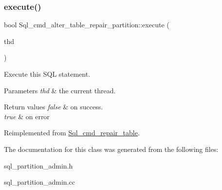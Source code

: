 \subsubsection{\texorpdfstring{execute()}{execute()}}
{\footnotesize\ttfamily bool Sql\+\_\+cmd\+\_\+alter\+\_\+table\+\_\+repair\+\_\+partition\+::execute (\begin{DoxyParamCaption}\item[{T\+HD $\ast$}]{thd }\end{DoxyParamCaption})\hspace{0.3cm}{\ttfamily [virtual]}}

Execute this S\+QL statement. 
\begin{DoxyParams}{Parameters}
{\em thd} & the current thread. \\
\hline
\end{DoxyParams}

\begin{DoxyRetVals}{Return values}
{\em false} & on success. \\
\hline
{\em true} & on error \\
\hline
\end{DoxyRetVals}


Reimplemented from \mbox{\hyperlink{classSql__cmd__repair__table_abb68d28756b9713e0d46774b3cafe39c}{Sql\+\_\+cmd\+\_\+repair\+\_\+table}}.



The documentation for this class was generated from the following files\+:\begin{DoxyCompactItemize}
\item 
sql\+\_\+partition\+\_\+admin.\+h\item 
sql\+\_\+partition\+\_\+admin.\+cc\end{DoxyCompactItemize}

